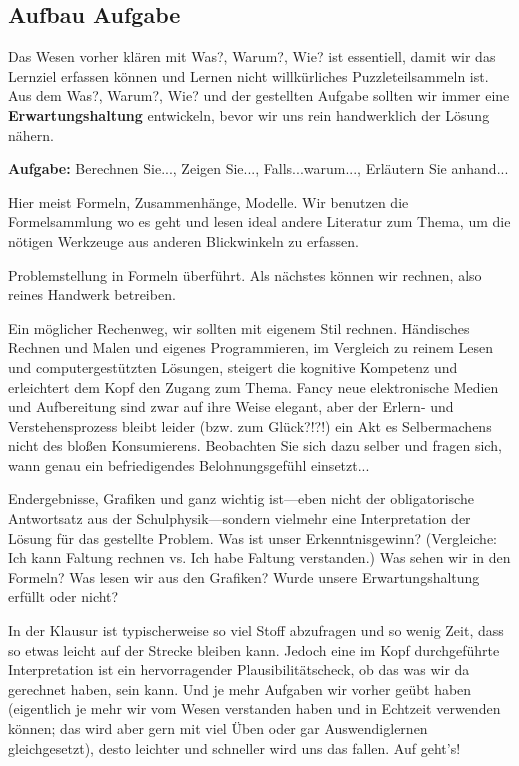 \newpage
\subsection*{Aufbau Aufgabe}
\begin{Ziel}
Das Wesen vorher klären mit Was?, Warum?, Wie? ist essentiell, damit wir das
Lernziel erfassen können und Lernen nicht willkürliches Puzzleteilsammeln ist.
Aus dem Was?, Warum?, Wie? und der gestellten Aufgabe sollten wir immer eine
\textbf{Erwartungshaltung} entwickeln, bevor wir uns rein handwerklich der Lösung nähern.
\end{Ziel}
\textbf{Aufgabe:} Berechnen Sie..., Zeigen Sie..., Falls...warum..., Erläutern
Sie anhand...
\begin{Werkzeug}
Hier meist Formeln, Zusammenhänge, Modelle. Wir benutzen die Formelsammlung
wo es geht und lesen ideal andere Literatur zum Thema, um die nötigen Werkzeuge
aus anderen Blickwinkeln zu erfassen.
\end{Werkzeug}
\begin{Ansatz}
Problemstellung in Formeln überführt. Als nächstes können wir rechnen, also
reines Handwerk betreiben.
\end{Ansatz}
\begin{ExCalc}
Ein möglicher Rechenweg, wir sollten mit eigenem Stil
rechnen.
Händisches Rechnen und Malen und eigenes Programmieren, im Vergleich zu reinem
Lesen und computergestützten Lösungen, steigert die kognitive Kompetenz und
erleichtert dem Kopf den Zugang zum Thema.
%
Fancy neue elektronische Medien und Aufbereitung sind zwar auf ihre Weise elegant,
aber der Erlern- und Verstehensprozess bleibt leider (bzw. zum Glück?!?!) ein
Akt es Selbermachens nicht des bloßen Konsumierens.
%
Beobachten Sie sich dazu selber und fragen sich, wann genau ein
befriedigendes Belohnungsgefühl einsetzt...
%
\end{ExCalc}
\begin{Loesung}
Endergebnisse, Grafiken und ganz wichtig ist---eben nicht der obligatorische Antwortsatz
aus der Schulphysik---sondern vielmehr eine Interpretation der Lösung
für das gestellte Problem.
%
Was ist unser Erkenntnisgewinn?
%
(Vergleiche: Ich kann Faltung rechnen vs. Ich habe Faltung verstanden.)
%
Was sehen wir in den Formeln?
%
Was lesen wir aus den Grafiken?
%
Wurde unsere Erwartungshaltung erfüllt oder nicht?

In der Klausur ist typischerweise so viel Stoff abzufragen und so wenig Zeit,
dass so etwas leicht auf der Strecke bleiben kann. Jedoch eine im Kopf
durchgeführte Interpretation ist ein hervorragender Plausibilitätscheck, ob das was
wir da gerechnet haben, sein kann. Und je mehr Aufgaben wir
vorher geübt haben (eigentlich je mehr wir vom Wesen verstanden haben und in
Echtzeit verwenden können; das wird aber gern mit viel Üben oder gar
Auswendiglernen gleichgesetzt),
desto leichter und schneller wird uns das fallen.
%
Auf geht's!
\end{Loesung}

